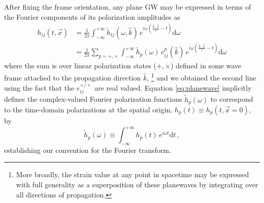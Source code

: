 \documentclass[aps,prd,twocolumn,superscriptaddress,preprintnumbers,floatfix,nofootinbib]{revtex4-2}
\newcommand{\beq}{\begin{equation}}
\newcommand{\eeq}{\end{equation}}
\newcommand*{\eq}[1]{Eq.~\eqref{eq:#1}}
\newcommand{\infd}{\mathrm{d}}
\begin{document}

After fixing the frame orientation, any plane GW may be expressed in terms of the Fourier components of its polarization amplitudes as
\begin{align}
\label{eq:planewave}
h_{ij}(t,\vec{x}) &= \frac{1}{2\pi}\int_{-\infty}^{+\infty} \tilde{h}_{ij}(\omega, \hat{k})\, e^{i\omega \left(\frac{\hat{k}\cdot\vec{x}}{c}-t\right)} \infd \omega \\
&= \frac{1}{2\pi} \sum_{p=+,\times} \int_{-\infty}^{+\infty} \tilde{h}_p(\omega)\, e^p_{ij}(\hat{k})\, e^{i\omega \left(\frac{\hat{k}\cdot\vec{x}}{c}-t\right)} \infd \omega \nonumber
\end{align}
where the sum is over linear polarization states ($+,\times$) defined in some wave frame attached to the propagation direction $\hat{k}$,%
\footnote{More broadly, the strain value at any point in spacetime may be expressed with full generality as a superposition of these planewaves
by integrating over all directions of propagation.}
and we obtained the second line using the fact that the $e^{+/\times}_{ij}$ are real valued.
Equation \eqref{eq:planewave} implicitly defines the complex-valued Fourier polarization functions $\tilde{h}_p(\omega)$ to correspond to the time-domain polarizations at the spatial origin, $h_p(t) \equiv h_p(t, \vec{x}=0)$, by
\beq \label{eq:ft}
\tilde{h}_p(\omega) \equiv \int_{-\infty}^{+\infty} h_p(t)\, e^{i\omega t} \infd t \, ,
\eeq
establishing our convention for the Fourier transform.
\end{document}
